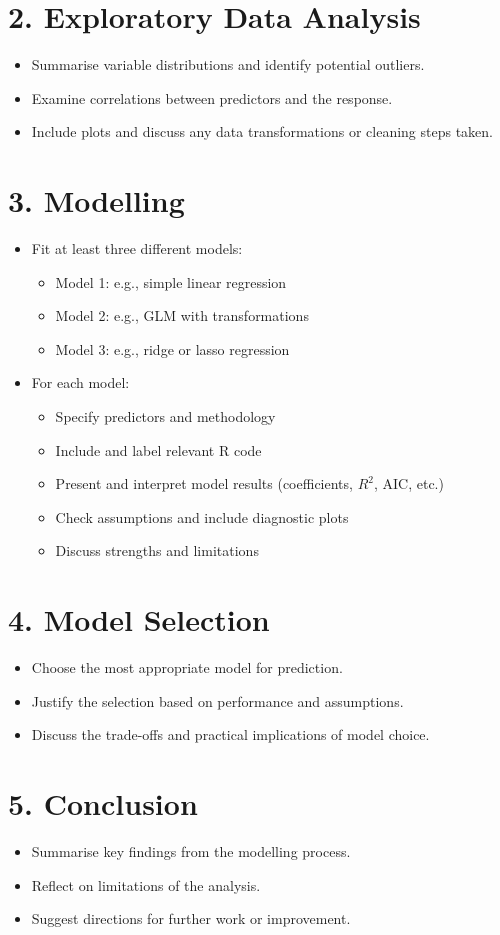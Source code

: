 \documentclass[11pt,a4paper]{article}
\begin{document}
\section*{2. Exploratory Data Analysis}
\begin{itemize}
    \item Summarise variable distributions and identify potential outliers.
    \item Examine correlations between predictors and the response.
    \item Include plots and discuss any data transformations or cleaning steps taken.
\end{itemize}

\section*{3. Modelling}
\begin{itemize}
    \item Fit at least three different models:
    \begin{itemize}
        \item Model 1: e.g., simple linear regression
        \item Model 2: e.g., GLM with transformations
        \item Model 3: e.g., ridge or lasso regression
    \end{itemize}
    \item For each model:
    \begin{itemize}
        \item Specify predictors and methodology
        \item Include and label relevant R code
        \item Present and interpret model results (coefficients, $R^2$, AIC, etc.)
        \item Check assumptions and include diagnostic plots
        \item Discuss strengths and limitations
    \end{itemize}
\end{itemize}

\section*{4. Model Selection}
\begin{itemize}
    \item Choose the most appropriate model for prediction.
    \item Justify the selection based on performance and assumptions.
    \item Discuss the trade-offs and practical implications of model choice.
\end{itemize}

\section*{5. Conclusion}
\begin{itemize}
    \item Summarise key findings from the modelling process.
    \item Reflect on limitations of the analysis.
    \item Suggest directions for further work or improvement.
\end{itemize}
\end{document}
